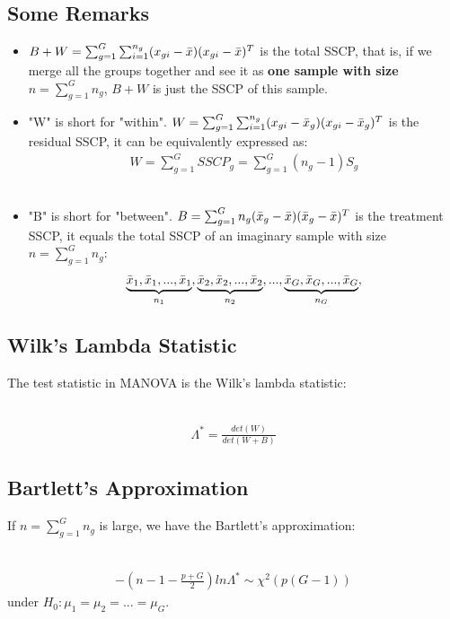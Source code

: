 \documentclass[12pt]{extarticle}
\newcommand{\<}{\langle}
\renewcommand{\>}{\rangle}
\theoremstyle{definition}
\begin{document}
\newpage
\subsection{Some Remarks}
\begin{itemize}
    \item $B+W=\sum_{g=1}^G\sum_{i=1}^{n_g}(x_{gi} - \Bar{x})(x_{gi} - \Bar{x})^T$ is the total SSCP, that is, if we merge all the groups together and see it as \textbf{one sample with size} $n=\sum_{g=1}^G n_g$, $B+W$ is just the SSCP of this sample.\\
    
    \item "W" is short for "within". $W=\sum_{g=1}^G \sum_{i=1}^{n_g}(x_{gi} -\Bar{x}_g)(x_{gi} -\Bar{x}_g)^T$ is the residual SSCP, it can be equivalently expressed as:\\
    \begin{eqnarray*}
    W = \sum_{g=1}^G SSCP_g = \sum_{g=1}^G (n_g -1)S_g
    \end{eqnarray*} \\
    
    \item "B" is short for "between". $B=\sum_{g=1}^G n_g (\Bar{x}_g -\Bar{x})(\Bar{x}_g -\Bar{x})^T$ is the treatment SSCP, it equals the total SSCP of an imaginary sample with size $n=\sum_{g=1}^G n_g$:\\
    \begin{eqnarray*}
    \underbrace{\Bar{x}_1,\Bar{x}_1,...,\Bar{x}_1}_{n_1},\underbrace{\Bar{x}_2,\Bar{x}_2,...,\Bar{x}_2}_{n_2},...,\underbrace{\Bar{x}_G,\Bar{x}_G,...,\Bar{x}_G}_{n_G},
    \end{eqnarray*}
\end{itemize}

\subsection{Wilk's Lambda Statistic}
The test statistic in MANOVA is the Wilk's lambda statistic: \\
\ \\
\begin{tcolorbox}[enhanced, drop fuzzy shadow, title=Wilk's Lambda Statistics]
\begin{eqnarray*}
\Lambda^* = \frac{det(W)}{det(W+B)}
\end{eqnarray*}
\end{tcolorbox}

\subsection{Bartlett's Approximation}
If $n=\sum_{g=1}^G n_g$ is large, we have the Bartlett's approximation: \\
\ \\
\begin{tcolorbox}[enhanced, drop fuzzy shadow, title=Bartlett's Approximation]
\begin{eqnarray*}
-\left( n-1-\frac{p+G}{2} \right)ln \Lambda^* \sim \chi^2 (p(G-1))
\end{eqnarray*}
under $H_0: \mu_1 = \mu_2 = ... = \mu_G$.
\end{tcolorbox}
\end{document}
